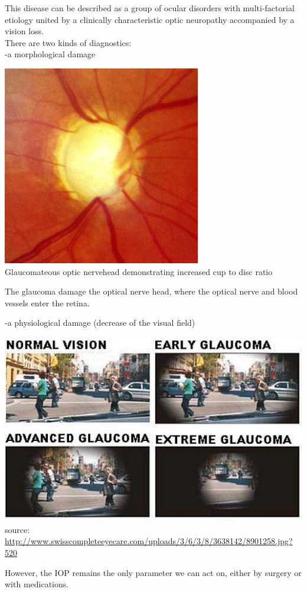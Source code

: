 \documentclass[9pt]{beamer}
\begin{document}
\begin{frame}
This disease can be described as a group of ocular disorders with multi-factorial etiology united by a clinically characteristic optic neuropathy accompanied by a vision loss.
\newline
\\
There are two kinds of diagnostics: \\
-a morphological damage
\begin{center}
\includegraphics[scale=.5]{Morphological.jpg}\\
\tiny{Glaucomateous optic nervehead demonstrating increased cup to disc ratio}
\end{center}
The glaucoma damage the optical nerve head, where the optical nerve and blood vessels enter the retina.
\end{frame}
\begin{frame}
-a physiological damage (decrease of the visual field)
\begin{center}
\includegraphics[scale=.5]{Glaucoma.jpg}\\
\tiny{source: \url{http://www.swisscompleteeyecare.com/uploads/3/6/3/8/3638142/8901258.jpg?520}}

\end{center}

However, the IOP remains the only parameter we can act on, either by surgery or with medications.
\end{frame}
\end{document}

